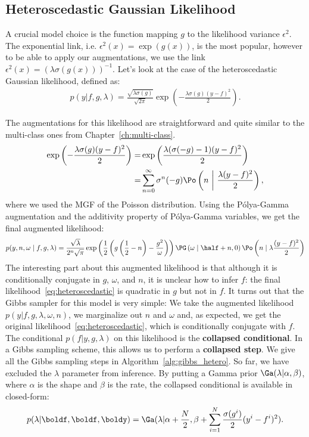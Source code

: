 \subsection{Heteroscedastic Gaussian Likelihood}
\label{sec:hetero_gaussian}
A crucial model choice is the function mapping $g$ to the likelihood variance $\epsilon^2$.
The exponential link, i.e. $\epsilon^2(x) = \exp(g(x))$, is the most popular, however to be able to apply our augmentations, we use the link $\epsilon^2(x) = \left(\lambda \sigma(g(x))\right)^{-1}$.
Let's look at the case of the heteroscedastic Gaussian likelihood, defined as:
\begin{align}
    p(y|f,g,\lambda) = \frac{\sqrt{\lambda \sigma(g)}}{\sqrt{2\pi}}\exp\left(-\frac{\lambda \sigma(g)(y-f)^2}{2}\right).\label{eq:hetero_lik}
\end{align}

The augmentations for this likelihood are straightforward and quite similar to the multi-class ones from Chapter~\ref{ch:multi-class}.
\begin{align}
    \exp\left(-\frac{\lambda\sigma(g)(y-f)^2}{2}\right) =& \exp\left(\frac{\lambda(\sigma(-g) -1)(y-f)^2}{2}\right)\nonumber\\
    =&\sum_{n=0}^\infty \sigma^n(-g)\Po \left(n~\middle|~\frac{\lambda(y-f)^2}{2}\right),\label{eq:aug_poisson}
\end{align}
where we used the \ac{MGF} of the Poisson distribution.
Using the P\'olya-Gamma augmentation and the additivity property of P\'olya-Gamma variables, we get the final augmented likelihood:
\begin{align}
    p(y,n,\omega\mid f,g,\lambda) = \frac{\sqrt{\lambda}}{2^n\sqrt{\pi}}\exp\left(\frac{1}{2}\left(g\left(\frac{1}{2}-n\right) - \frac{g^2}{\omega}\right)\right)\PG \left(\omega \mid \half + n, 0\right) \Po \left(n \mid \lambda\frac{(y-f)^2}{2}\right)\label{eq:heteroscedastic}
\end{align}
The interesting part about this augmented likelihood is that although it is conditionally conjugate in $g$, $\omega$, and $n$, it is unclear how to infer $f$:
the final likelihood~\eqref{eq:heteroscedastic} is quadratic in $g$ but not in $f$.
It turns out that the Gibbs sampler for this model is very simple:
We take the augmented likelihood $p(y|f,g,\lambda,\omega,n)$, we marginalize out $n$ and $\omega$ and, as expected, we get the original likelihood~\eqref{eq:heteroscedastic}, which is conditionally conjugate with $f$.
The conditional $p(f|y,g,\lambda)$ on this likelihood is the \textbf{collapsed conditional}.
In a Gibbs sampling scheme, this allows us to perform a \textbf{collapsed step}.
We give all the Gibbs sampling steps in Algorithm~\ref{alg:gibbs_hetero}.
So far, we have excluded the $\lambda$ parameter from inference.
By putting a Gamma prior $\Ga(\lambda|\alpha, \beta)$, where $\alpha$ is the shape and $\beta$ is the rate, the collapsed conditional is available in closed-form:
\begin{align*}
    p(\lambda|\boldf, \boldf, \boldy) = \Ga(\lambda| \alpha + \frac{N}{2}, \beta + \sum_{i=1}^N \frac{\sigma(g^i)}{2}(y^i - f^i)^2).
\end{align*}


